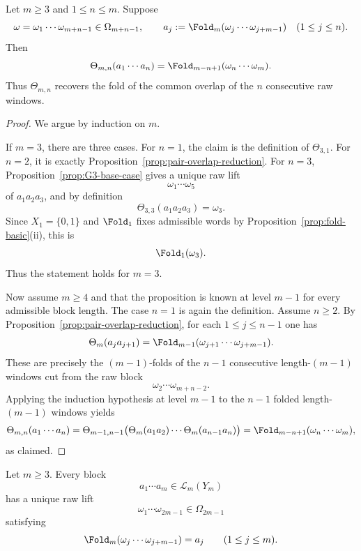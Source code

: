 \begin{proposition}
\label{prop:common-overlap-decoder}
Let $m\ge 3$ and $1\le n\le m$.  Suppose
\[
\omega=\omega_1\cdots\omega_{m+n-1}\in\Omega_{m+n-1},
\qquad
a_j:=\Fold_m(\omega_j\cdots\omega_{j+m-1})
\quad (1\le j\le n).
\]
Then
\[
\Theta_{m,n}(a_1\cdots a_n)
=
\Fold_{m-n+1}(\omega_n\cdots\omega_m).
\]
Thus $\Theta_{m,n}$ recovers the fold of the common overlap of the $n$
consecutive raw windows.
\end{proposition}

\begin{proof}
We argue by induction on $m$.

If $m=3$, there are three cases.  For $n=1$, the claim is the definition of
$\Theta_{3,1}$.  For $n=2$, it is exactly
Proposition~\ref{prop:pair-overlap-reduction}.  For $n=3$,
Proposition~\ref{prop:G3-base-case} gives a unique raw lift
\[
\omega_1\cdots\omega_5
\]
of $a_1a_2a_3$, and by definition
\[
\Theta_{3,3}(a_1a_2a_3)=\omega_3.
\]
Since $X_1=\{0,1\}$ and $\Fold_1$ fixes admissible words by
Proposition~\ref{prop:fold-basic}\textup{(ii)}, this is
\[
\Fold_1(\omega_3).
\]
Thus the statement holds for $m=3$.

Now assume $m\ge 4$ and that the proposition is known at level $m-1$ for every
admissible block length.  The case $n=1$ is again the definition.  Assume
$n\ge 2$.  By Proposition~\ref{prop:pair-overlap-reduction}, for each
$1\le j\le n-1$ one has
\[
\Theta_m(a_ja_{j+1})
=
\Fold_{m-1}(\omega_{j+1}\cdots\omega_{j+m-1}).
\]
These are precisely the $(m-1)$-folds of the $n-1$ consecutive length-$(m-1)$
windows cut from the raw block
\[
\omega_2\cdots\omega_{m+n-2}.
\]
Applying the induction hypothesis at level $m-1$ to the $n-1$ folded
length-$(m-1)$ windows yields
\[
\Theta_{m,n}(a_1\cdots a_n)
=
\Theta_{m-1,n-1}\bigl(
\Theta_m(a_1a_2)\cdots\Theta_m(a_{n-1}a_n)
\bigr)
=
\Fold_{m-n+1}(\omega_n\cdots\omega_m),
\]
as claimed.
\end{proof}

\begin{theorem}
\label{thm:length-m-block-unique-lift}
Let $m\ge 3$.  Every block
\[
a_1\cdots a_m\in\mathcal L_m(Y_m)
\]
has a unique raw lift
\[
\omega_1\cdots\omega_{2m-1}\in\Omega_{2m-1}
\]
satisfying
\[
\Fold_m(\omega_j\cdots\omega_{j+m-1})=a_j
\qquad (1\le j\le m).
\]
\end{theorem}

